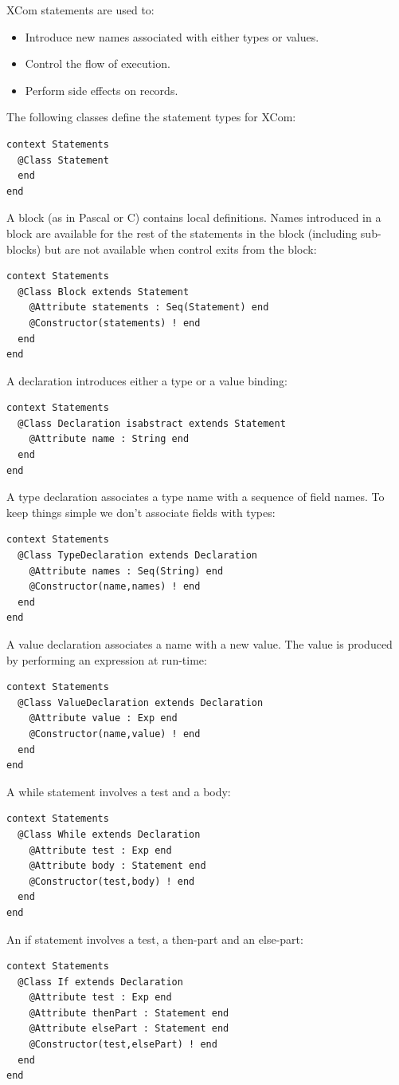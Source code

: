 \documentclass{article}
\begin{document}
XCom statements are used to:
\begin{itemize}
\item Introduce new names associated with either types or values.
\item Control the flow of execution.
\item Perform side effects on records.
\end{itemize}
The following classes define the statement types for XCom:
\begin{verbatim}
context Statements
  @Class Statement
  end
end
\end{verbatim}
A block (as in Pascal or C) contains local definitions. Names introduced in a block
are available for the rest of the statements in the block (including sub-blocks) but are
not available when control exits from the block:
\begin{verbatim}
context Statements
  @Class Block extends Statement
    @Attribute statements : Seq(Statement) end
    @Constructor(statements) ! end
  end
end
\end{verbatim}
A declaration introduces either a type or a value binding:
\begin{verbatim}
context Statements
  @Class Declaration isabstract extends Statement
    @Attribute name : String end
  end
end
\end{verbatim}
A type declaration associates a type name with a sequence of field names. To keep things
simple we don't associate fields with types:
\begin{verbatim}
context Statements
  @Class TypeDeclaration extends Declaration
    @Attribute names : Seq(String) end
    @Constructor(name,names) ! end
  end
end
\end{verbatim}
A value declaration associates a name with a new value. The value is produced by performing
an expression at run-time:
\begin{verbatim}
context Statements
  @Class ValueDeclaration extends Declaration
    @Attribute value : Exp end
    @Constructor(name,value) ! end
  end
end
\end{verbatim}
A while statement involves a test and a body:
\begin{verbatim}
context Statements
  @Class While extends Declaration
    @Attribute test : Exp end
    @Attribute body : Statement end
    @Constructor(test,body) ! end
  end
end
\end{verbatim}
An if statement involves a test, a then-part and an else-part:
\begin{verbatim}
context Statements
  @Class If extends Declaration
    @Attribute test : Exp end
    @Attribute thenPart : Statement end
    @Attribute elsePart : Statement end
    @Constructor(test,elsePart) ! end
  end
end
\end{verbatim}
\end{document}
